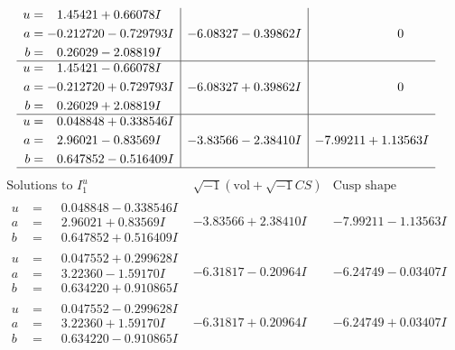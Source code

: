 \documentclass[1p]{elsarticle_modified}
\theoremstyle{definition}
\newcommand{\I}{\sqrt{-1}}
\begin{document}
$$\begin{array}{c|c|c}
\begin{aligned}
u &= \phantom{-}1.45421 + 0.66078 I \\
a &= -0.212720 - 0.729793 I \\
b &= \phantom{-}0.26029 - 2.08819 I\end{aligned}
 & -6.08327 - 0.39862 I & \phantom{-0.000000 } 0 \\ \hline\begin{aligned}
u &= \phantom{-}1.45421 - 0.66078 I \\
a &= -0.212720 + 0.729793 I \\
b &= \phantom{-}0.26029 + 2.08819 I\end{aligned}
 & -6.08327 + 0.39862 I & \phantom{-0.000000 } 0 \\ \hline\begin{aligned}
u &= \phantom{-}0.048848 + 0.338546 I \\
a &= \phantom{-}2.96021 - 0.83569 I \\
b &= \phantom{-}0.647852 - 0.516409 I\end{aligned}
 & -3.83566 - 2.38410 I & -7.99211 + 1.13563 I\\
 \hline 
 \end{array}$$\newpage$$\begin{array}{c|c|c}  
\text{Solutions to }I^u_{1}& \I (\text{vol} + \sqrt{-1}CS) & \text{Cusp shape}\\
 \hline 
\begin{aligned}
u &= \phantom{-}0.048848 - 0.338546 I \\
a &= \phantom{-}2.96021 + 0.83569 I \\
b &= \phantom{-}0.647852 + 0.516409 I\end{aligned}
 & -3.83566 + 2.38410 I & -7.99211 - 1.13563 I \\ \hline\begin{aligned}
u &= \phantom{-}0.047552 + 0.299628 I \\
a &= \phantom{-}3.22360 - 1.59170 I \\
b &= \phantom{-}0.634220 + 0.910865 I\end{aligned}
 & -6.31817 - 0.20964 I & -6.24749 - 0.03407 I \\ \hline\begin{aligned}
u &= \phantom{-}0.047552 - 0.299628 I \\
a &= \phantom{-}3.22360 + 1.59170 I \\
b &= \phantom{-}0.634220 - 0.910865 I\end{aligned}
 & -6.31817 + 0.20964 I & -6.24749 + 0.03407 I \\ \hline\begin{aligned}

\end{aligned}
\end{array}$$
\end{document}
